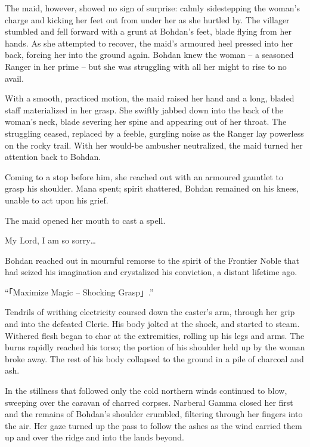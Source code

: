  

The maid, however, showed no sign of surprise: calmly sidestepping the woman’s charge and kicking her feet out from under her as she hurtled by. The villager stumbled and fell forward with a grunt at Bohdan’s feet, blade flying from her hands. As she attempted to recover, the maid’s armoured heel pressed into her back, forcing her into the ground again. Bohdan knew the woman – a seasoned Ranger in her prime – but she was struggling with all her might to rise to no avail.

 

With a smooth, practiced motion, the maid raised her hand and a long, bladed staff materialized in her grasp. She swiftly jabbed down into the back of the woman’s neck, blade severing her spine and appearing out of her throat. The struggling ceased, replaced by a feeble, gurgling noise as the Ranger lay powerless on the rocky trail. With her would-be ambusher neutralized, the maid turned her attention back to Bohdan.

 

Coming to a stop before him, she reached out with an armoured gauntlet to grasp his shoulder. Mana spent; spirit shattered, Bohdan remained on his knees, unable to act upon his grief.

 

The maid opened her mouth to cast a spell.

 

My Lord, I am so sorry…

 

Bohdan reached out in mournful remorse to the spirit of the Frontier Noble that had seized his imagination and crystalized his conviction, a distant lifetime ago.

“「Maximize Magic – Shocking Grasp」.”

 

Tendrils of writhing electricity coursed down the caster’s arm, through her grip and into the defeated Cleric. His body jolted at the shock, and started to steam. Withered flesh began to char at the extremities, rolling up his legs and arms. The burns rapidly reached his torso; the portion of his shoulder held up by the woman broke away. The rest of his body collapsed to the ground in a pile of charcoal and ash.

 

In the stillness that followed only the cold northern winds continued to blow, sweeping over the caravan of charred corpses. Narberal Gamma closed her first and the remains of Bohdan’s shoulder crumbled, filtering through her fingers into the air. Her gaze turned up the pass to follow the ashes as the wind carried them up and over the ridge and into the lands beyond.

